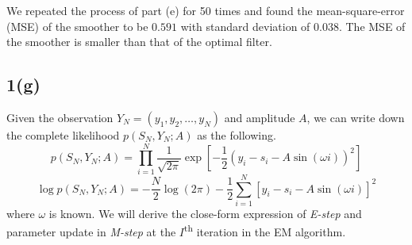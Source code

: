 \documentclass[a4paper, 11pt]{article}
\begin{document}
We repeated the process of part (e) for 50 times and found the mean-square-error (MSE) of the smoother to be $0.591$ with standard deviation of $0.038$. The MSE of the smoother is smaller than that of the optimal filter. 


\subsection*{1(g)}

Given the observation $Y_N = (y_1, y_2, \dots, y_N)$ and amplitude $A$, we can write down the complete likelihood $p(S_N, Y_N; A)$ as the following. 
\begin{equation}
p(S_N, Y_N; A) = \prod_{i=1}^N\frac{1}{\sqrt{2\pi}}\exp\left[-\frac{1}{2}(y_i - s_i - A\sin(\omega i))^2 \right]
\end{equation}
\begin{equation}
\log p(S_N, Y_N; A) = -\frac{N}{2}\log(2\pi) - \frac{1}{2}\sum_{i=1}^N\left[y_i-s_i-A\sin(\omega i) \right]^2
\end{equation}
where $\omega$ is known. We will derive the close-form expression of \textit{E-step} and parameter update in \textit{M-step} at the $I$\textsuperscript{th} iteration in the EM algorithm. 
\end{document}
